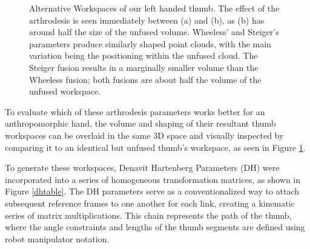 \documentclass[letterpaper, 10 pt, conference]{ieeeconf}  %
\newcommand{\rFig}[1]{Figure \ref{#1}}
\begin{document}
\begin{figure}
	\caption{Alternative Workspaces of our left handed thumb. The effect of the arthrodesis is seen immediately between (a) and (b), as (b) has around half the size of the unfused volume. Wheeless' and Steiger's parameters produce similarly shaped point clouds, with the main variation being the positioning within the unfused cloud. The Steiger fusion results in a marginally smaller volume than the Wheeless fusion; both fusions are about half the volume of the unfused workspace.}\label{workspaces}
\vspace{-6pt}
\end{figure}

To evaluate which of these arthrodesis parameters works better for an anthropomorphic hand, the volume and shaping of their resultant thumb workspaces can be overlaid in the same 3D space and visually inspected by comparing it to an identical but unfused thumb's workspace, as seen in \rFig{workspaces}.
	
	To generate these workspaces, Denavit Hartenberg Parameters (DH) were incorporated into a series of homogeneous transformation matrices, as shown in \rFig{dhtable}. The DH parameters serve as a conventionalized way to attach subsequent reference frames to one another for each link, creating a kinematic series of matrix multiplications. This chain represents the path of the thumb, where the angle constraints and lengths of the thumb segments are defined using robot manipulator notation. 
	
\end{document}
